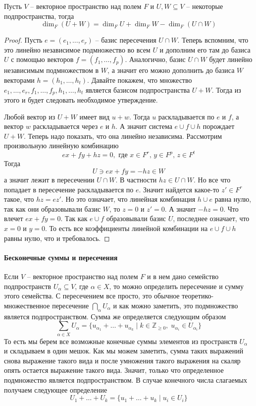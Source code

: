 \begin{claim}
Пусть $V$ -- векторное пространство над полем $F$ и $U,W\subseteq V$ -- некоторые подпространства, тогда 
\[
\dim_F (U + W) = \dim_F U + \dim_F W - \dim_F (U\cap W)
\]
\end{claim}
\begin{proof}
Пусть $e=(e_1,\ldots,e_r)$ -- базис пересечения $U\cap W$.
Теперь вспомним, что это линейно независимое подмножество во всем $U$ и дополним его там до базиса $U$ с помощью векторов $f=(f_1,\ldots, f_p)$.
Аналогично, базис $U\cap W$ будет линейно независимым подмножеством в $W$, а значит его можно дополнить до базиса $W$ векторами $h=(h_1,\ldots,h_t)$.
Давайте покажем, что множество $e_1,\ldots,e_r, f_1,\ldots,f_p,h_1,\ldots,h_t$ является базисом подпространства $U + W$.
Тогда из этого и будет следовать необходимое утверждение.

Любой вектор из $U+W$ имеет вид $u+w$.
Тогда $u$ раскладывается по $e$ и $f$, а вектор $w$ раскладывается через $e$ и $h$.
А значит система $e\cup f\cup h$ порождает $U + W$.
Теперь надо показать, что она линейно независима.
Рассмотрим произвольную линейную комбинацию
\[
e x + fy + hz = 0, \text{ где }x\in F^r,\, y\in F^p,\, z\in F^t
\]
Тогда
\[
U \ni ex +fy = -hz \in W
\]
а значит лежит в пересечении $U\cap W$.
В частности $hz \in U\cap W$.
Но все что попадает в пересечение раскладывается по $e$.
Значит найдется какое-то $z'\in F^r$ такое, что $hz = ez'$.
Но это означает, что линейная комбинация $h\cup e$ равна нулю, так как они образовывали базис $W$, то $z =0$ и $z' = 0$.
А значит $-hz = 0$.
Что влечет $ex + fy = 0$.
Так как $e \cup f$ образовывали базис $U$, последнее означает, что $x = 0$ и $y = 0$.
То есть все коэффициенты линейной комбинации на $e\cup f\cup h$ равны нулю, что и требовалось.
\end{proof}


\paragraph{Бесконечные суммы и пересечения}

Если $V$ -- векторное пространство над полем $F$ и в нем дано семейство подпространств $U_\alpha \subseteq V$, где $\alpha\in X$, то можно определить пересечение и сумму этого семейства.
С пересечением все просто, это обычное теоретико-множественное пересечение $\bigcap_{\alpha} U_\alpha$ и как можно заметить, это подмножество является подпространством.
Сумма же определяется следующим образом
\[
\sum_{\alpha \in X} U_\alpha = \{u_{\alpha_1}+\ldots+u_{\alpha_k} \mid k\in\mathbb Z_{\geqslant 0},\; u_{\alpha_i}\in U_{\alpha_i}\}
\]
То есть мы берем все возможные конечные суммы элементов из пространств $U_\alpha$ и складываем в один мешок.
Как мы можем заметить, сумма таких выражений снова выражение такого вида и после умножения такого выражения на скаляр опять остается выражение такого вида.
Значит, только что определенное подмножество является подпространством.
В случае конечного числа слагаемых получаем следующее определение
\[
U_1 + \ldots + U_k = \{u_1 + \ldots + u_k \mid u_i\in U_i\}
\]

